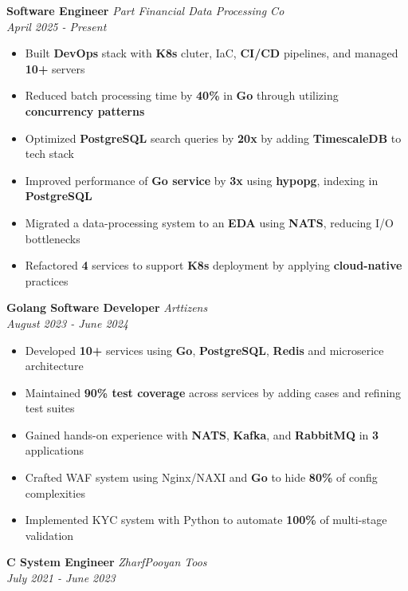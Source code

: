 \documentclass{engineercv}
\begin{document}

\textbf{Software Engineer}
\textit{Part Financial Data Processing Co}\\
\textit{April 2025 - Present}

\begin{itemize}
  \item Built \textbf{DevOps} stack with \textbf{K8s} cluter, IaC, \textbf{CI/CD} pipelines, and managed \textbf{10+} servers
  \item Reduced batch processing time by \textbf{40\%} in \textbf{Go} through utilizing \textbf{concurrency patterns}
  \item Optimized \textbf{PostgreSQL} search queries by \textbf{20x} by adding \textbf{TimescaleDB} to tech stack
  \item Improved performance of \textbf{Go service} by \textbf{3x} using \textbf{hypopg}, indexing in \textbf{PostgreSQL}
  \item Migrated a data-processing system to an \textbf{EDA} using \textbf{NATS}, reducing I/O bottlenecks
  \item Refactored \textbf{4} services to support \textbf{K8s} deployment by applying \textbf{cloud-native} practices
\end{itemize}

\textbf{Golang Software Developer}
\textit{Arttizens} \\
\textit{August 2023 - June 2024}

\begin{itemize}
  \item Developed \textbf{10+} services using \textbf{Go}, \textbf{PostgreSQL}, \textbf{Redis} and microserice architecture
  \item Maintained \textbf{90\% test coverage} across services by adding cases and refining test suites
  \item Gained hands-on experience with \textbf{NATS}, \textbf{Kafka}, and \textbf{RabbitMQ} in \textbf{3} applications
  \item Crafted WAF system using Nginx/NAXI and \textbf{Go} to hide \textbf{80\%} of config complexities
  \item Implemented KYC system with Python to automate \textbf{100\%} of multi-stage validation
\end{itemize}

\textbf{C System Engineer}
\textit{ZharfPooyan Toos}\\
\textit{July 2021 - June 2023}
\end{document}
